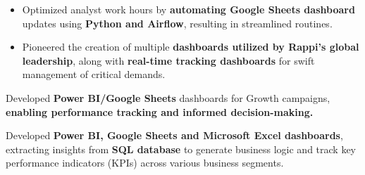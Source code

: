 

\begin{itemize}
  \item Optimized analyst work hours by \textbf{automating Google Sheets dashboard} updates using \textbf{Python and Airflow}, resulting in streamlined routines.
  \item Pioneered the creation of multiple \textbf{dashboards utilized by Rappi's global leadership}, along with \textbf{real-time tracking dashboards} for swift management of critical demands.
\end{itemize}


Developed \textbf{Power BI/Google Sheets} dashboards for Growth campaigns, \textbf{enabling performance tracking and informed decision-making.}


Developed \textbf{Power BI, Google Sheets and Microsoft Excel dashboards}, extracting insights from \textbf{SQL database} to generate business logic and track key performance indicators (KPIs) across various business segments.
\vspace{-1.5em} %